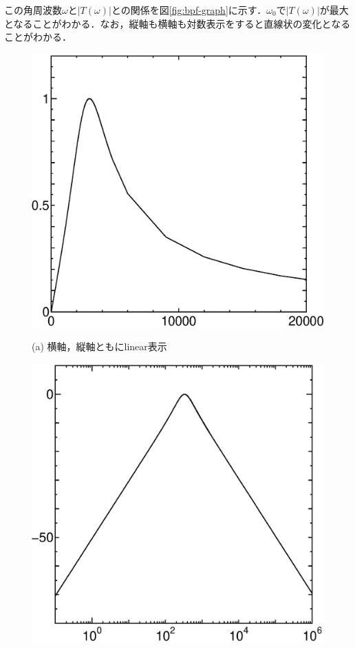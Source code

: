 この角周波数$\omega$と$|T(\omega)|$との関係を図\ref{fig:bpf-graph}に示す．$\omega_0$で$|T(\omega)|$が最大となることがわかる．なお，縦軸も横軸も対数表示をすると直線状の変化となることがわかる．

\begin{figure}[H]
\begin{center}
\begin{minipage}{.36\textwidth}
\begin{center}
\includegraphics[width=.98\textwidth]{fig/filter-bpf-n2.eps}

(a) 横軸，縦軸ともにlinear表示
\end{center}
\end{minipage}
\begin{minipage}{.36\textwidth}
\begin{center}
\includegraphics[width=.98\textwidth]{fig/filter-bpf-log3.eps}


\end{center}
\end{minipage}
\end{center}
\end{figure}
